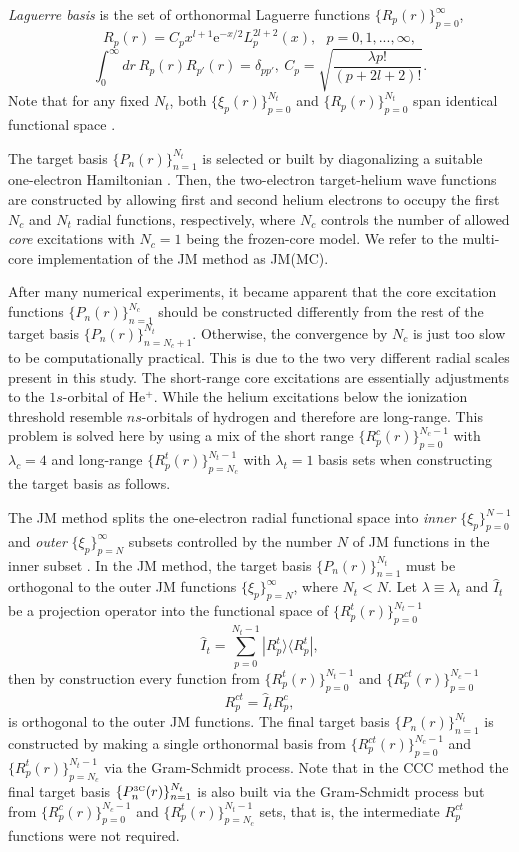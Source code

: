 \documentclass[aip
, pra
, showpacs
, aps
, twocolumn
, groupedaddress
, floatfix
]{revtex4}
\newcommand{\beq}{\begin{equation}}
\newcommand{\eeq}{\end{equation}}
\begin{document}
{\em Laguerre basis} is the set of orthonormal Laguerre functions $\{R_p(r)\}_{p=0}^\infty$,
\beq
R_p(r) = C_p x^{l+1} \mbox{e}^{-x /2}
L_p^{2l+2}(x), \ \ \ p = 0, 1, ..., \infty,
\eeq
\beq
\int_0^\infty dr \ R_p(r) R_{p'}(r) = \delta_{pp'}, \ C_p= \sqrt{\frac{\lambda p!}{ (p+2l+2)!}}.
\eeq
Note that for any fixed $N_t$, both $\{\xi_p(r)\}_{p=0}^{N_t}$ and $\{R_p(r)\}_{p=0}^{N_t}$
span identical functional space \cite{KB10p022708}.


The target basis $\{P_n(r)\}_{n=1}^{N_t}$ is selected or built by diagonalizing a suitable one-electron Hamiltonian \cite{KB10p022708, KFB11}. Then,
the two-electron target-helium wave functions are constructed by allowing first and second helium electrons to occupy the first $N_c$ and $N_t$ radial functions, respectively,
where $N_c$ controls the number of allowed {\em core} excitations with $N_c=1$ being the frozen-core model.
We refer to the multi-core implementation of the JM method as JM(MC).


After many numerical experiments, it became apparent that the core excitation functions $\{P_n(r)\}_{n=1}^{N_c}$ should be constructed differently from the rest of the target basis
$\{P_n(r)\}_{n=N_c+1}^{N_t}$. Otherwise, the convergence by $N_c$ is just too slow to be computationally practical.
This is due to the two very different radial scales present in this study.
The short-range core excitations are essentially adjustments to the $1s$-orbital of He$^+$.
While the helium excitations below the ionization threshold resemble $ns$-orbitals of hydrogen and therefore are long-range.
This problem is solved here by using a mix of the short range $\{R^c_p(r)\}_{p=0}^{N_c-1}$ with $\lambda_c=4$
and long-range $\{R^t_p(r)\}_{p=N_c}^{N_t-1}$ with $\lambda_t=1$  basis sets
when constructing the target basis as follows.


The JM method splits the one-electron radial functional space into {\em inner} $\{\xi_p\}_{p=0}^{N-1}$
and {\em outer} $\{\xi_p\}_{p=N}^\infty$
subsets controlled by the number $N$ of JM functions in the inner subset \cite{HY74p1201,BR76p1491}.
In the JM method, the target basis $\{P_n(r)\}_{n=1}^{N_t}$ must be orthogonal to the outer JM functions $\{\xi_p\}_{p=N}^\infty$, where $N_t<N$.
Let $\lambda \equiv \lambda_t$ and $\hat{I}_t$ be a projection operator into the functional space of $\{R^t_p(r)\}_{p=0}^{N_t-1}$
\beq
\hat{I}_t = \sum_{p=0}^{N_t-1} | R_p^t \rangle \langle R_p^t |,
\eeq
then by construction every function from $\{R^t_p(r)\}_{p=0}^{N_t-1}$ and  $\{R^{ct}_p(r)\}_{p=0}^{N_c-1}$
\beq
R^{ct}_p = \hat{I}_t R^{c}_p,
\eeq
is orthogonal to the outer JM functions.
The final target basis $\{P_n(r)\}_{n=1}^{N_t}$ is constructed by making a single orthonormal basis from
$\{R^{ct}_p(r)\}_{p=0}^{N_c-1}$ and $\{R^t_p(r)\}_{p=N_c}^{N_t-1}$
via the Gram-Schmidt process.
Note that in the CCC method the final target basis
$\{P^{\mbox{{\tiny 3C}}}_n(r)\}_{n=1}^{N_t}$ is also built via the Gram-Schmidt process but from
$\{R^{c}_p(r)\}_{p=0}^{N_c-1}$ and $\{R^t_p(r)\}_{p=N_c}^{N_t-1}$ sets, that is, the intermediate $R^{ct}_p$ functions were not required.
\end{document}
